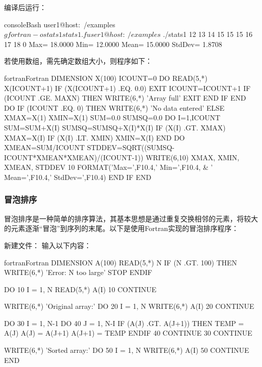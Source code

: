 编译后运行：
\begin{envcode}{console}{Bash}
user1@host:~/examples$ gfortran -o stats1 stats1.f
user1@host:~/examples$ ./stats1
12
13
14
15
15
15
16
17
18
0
Max=   18.0000 Min=   12.0000 Mean=   15.0000 StdDev=    1.8708
\end{envcode}

若使用数组，需先确定数组大小，则程序如下：
\begin{envcode}{fortran}{Fortran}
      DIMENSION X(100)
      ICOUNT=0
      DO
          READ(5,*) X(ICOUNT+1)
          IF (X(ICOUNT+1) .EQ. 0.0) EXIT
          ICOUNT=ICOUNT+1
          IF (ICOUNT .GE. MAXN) THEN
              WRITE(6,*) 'Array full'
              EXIT
          END IF
      END DO
      IF (ICOUNT .EQ. 0) THEN
          WRITE(6,*) 'No data entered'
      ELSE
          XMAX=X(1)
          XMIN=X(1)
          SUM=0.0
          SUMSQ=0.0
          DO I=1,ICOUNT
              SUM=SUM+X(I)
              SUMSQ=SUMSQ+X(I)*X(I)
              IF (X(I) .GT. XMAX) XMAX=X(I)
              IF (X(I) .LT. XMIN) XMIN=X(I)
          END DO
          XMEAN=SUM/ICOUNT
          STDDEV=SQRT((SUMSQ-ICOUNT*XMEAN*XMEAN)/(ICOUNT-1))
          WRITE(6,10) XMAX, XMIN, XMEAN, STDDEV
   10     FORMAT('Max=',F10.4,' Min=',F10.4,
     &        ' Mean=',F10.4,' StdDev=',F10.4)
      END IF
      END
\end{envcode}

\subsubsection{冒泡排序}
冒泡排序是一种简单的排序算法，其基本思想是通过重复交换相邻的元素，将较大的元素逐渐“冒泡”到序列的末尾。以下是使用Fortran实现的冒泡排序程序：

新建文件：
输入以下内容：
\begin{envcode}{fortran}{Fortran}
      DIMENSION A(100)
      READ(5,*) N
      IF (N .GT. 100) THEN
        WRITE(6,*) 'Error: N too large'
        STOP
      ENDIF
      
      DO 10 I = 1, N
        READ(5,*) A(I)
   10 CONTINUE
      
      WRITE(6,*) 'Original array:'
      DO 20 I = 1, N
        WRITE(6,*) A(I)
   20 CONTINUE
      
      DO 30 I = 1, N-1
        DO 40 J = 1, N-I
          IF (A(J) .GT. A(J+1)) THEN
            TEMP = A(J)
            A(J) = A(J+1)
            A(J+1) = TEMP
          ENDIF
   40   CONTINUE
   30 CONTINUE
      
      WRITE(6,*) 'Sorted array:'
      DO 50 I = 1, N
        WRITE(6,*) A(I)
   50 CONTINUE
      END
\end{envcode}

